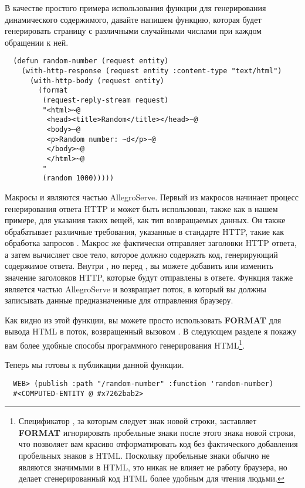 В качестве простого примера использования функции для генерирования динамического
содержимого, давайте напишем функцию, которая будет генерировать страницу с различными
случайными числами при каждом обращении к ней.

\begin{lstlisting}
  (defun random-number (request entity)
    (with-http-response (request entity :content-type "text/html")
      (with-http-body (request entity)
        (format 
         (request-reply-stream request)
         "<html>~@
          <head><title>Random</title></head>~@
          <body>~@
          <p>Random number: ~d</p>~@
          </body>~@
          </html>~@
         "
         (random 1000)))))
\end{lstlisting}

Макросы  и  являются частью
AllegroServe. Первый из макросов начинает процесс генерирования ответа HTTP и может быть
использован, также как в нашем примере, для указания таких вещей, как тип возвращаемых
данных. Он также обрабатывает различные требования, указанные в стандарте HTTP, такие как
обработка запросов . Макрос же  фактически
отправляет заголовки HTTP ответа, а затем вычисляет свое тело, которое должно содержать
код, генерирующий содержимое ответа. Внутри , но перед
, вы можете добавить или изменить значение заголовков HTTP, которые
будут отправлены в ответе. Функция  также является частью
AllegroServe и возвращает поток, в который вы должны записывать данные предназначенные для
отправления браузеру.

Как видно из этой функции, вы можете просто использовать \textbf{FORMAT} для вывода HTML в
поток, возвращенный вызовом . В следующем разделе я покажу вам
более удобные способы программного генерирования HTML\footnote{Спецификатор , за
  которым следует знак новой строки, заставляет \textbf{FORMAT} игнорировать пробельные
  знаки после этого знака новой строки, что позволяет вам красиво отформатировать код без
  фактического добавления пробельных знаков в HTML. Поскольку пробельные знаки обычно не
  являются значимыми в HTML, это никак не влияет не работу браузера, но делает
  сгенерированный код HTML более удобным для чтения людьми.}.

Теперь мы готовы к публикации данной функции.

\begin{lstlisting}
  WEB> (publish :path "/random-number" :function 'random-number)
  #<COMPUTED-ENTITY @ #x7262bab2>
\end{lstlisting}


